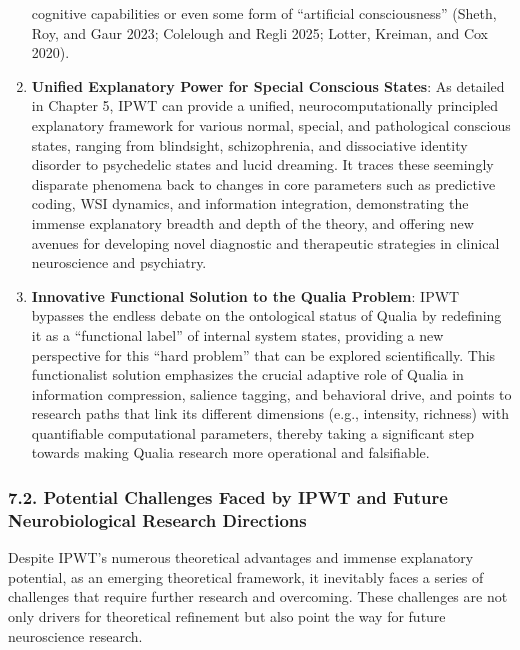 \documentclass[
  a4paper]{article}
\begin{document}
\begin{enumerate}
  cognitive capabilities or even some form of ``artificial
  consciousness'' (Sheth, Roy, and Gaur 2023; Colelough and Regli 2025;
  Lotter, Kreiman, and Cox 2020).
\item
  \textbf{Unified Explanatory Power for Special Conscious States}: As
  detailed in Chapter 5, IPWT can provide a unified,
  neurocomputationally principled explanatory framework for various
  normal, special, and pathological conscious states, ranging from
  blindsight, schizophrenia, and dissociative identity disorder to
  psychedelic states and lucid dreaming. It traces these seemingly
  disparate phenomena back to changes in core parameters such as
  predictive coding, WSI dynamics, and information integration,
  demonstrating the immense explanatory breadth and depth of the theory,
  and offering new avenues for developing novel diagnostic and
  therapeutic strategies in clinical neuroscience and psychiatry.
\item
  \textbf{Innovative Functional Solution to the Qualia Problem}: IPWT
  bypasses the endless debate on the ontological status of Qualia by
  redefining it as a ``functional label'' of internal system states,
  providing a new perspective for this ``hard problem'' that can be
  explored scientifically. This functionalist solution emphasizes the
  crucial adaptive role of Qualia in information compression, salience
  tagging, and behavioral drive, and points to research paths that link
  its different dimensions (e.g., intensity, richness) with quantifiable
  computational parameters, thereby taking a significant step towards
  making Qualia research more operational and falsifiable.
\end{enumerate}

\subsubsection{7.2. Potential Challenges Faced by IPWT and Future
Neurobiological Research
Directions}\label{potential-challenges-faced-by-ipwt-and-future-neurobiological-research-directions}

Despite IPWT's numerous theoretical advantages and immense explanatory
potential, as an emerging theoretical framework, it inevitably faces a
series of challenges that require further research and overcoming. These
challenges are not only drivers for theoretical refinement but also
point the way for future neuroscience research.
\end{document}
